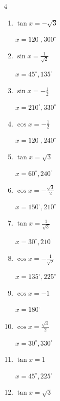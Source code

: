 \begin{multicols}{4}
\begin{enumerate}
  \item $\displaystyle \tan{x}  = -\sqrt{3}$

        $\displaystyle x = 120^{\circ} , 300^{\circ}$

  \item $\displaystyle \sin{x}  = \frac{1}{\sqrt{2}}$

        $\displaystyle x = 45^{\circ} , 135^{\circ}$

  \item $\displaystyle \sin{x}  = -\frac{1}{2}$

        $\displaystyle x = 210^{\circ} , 330^{\circ}$

  \item $\displaystyle \cos{x}  = -\frac{1}{2}$

        $\displaystyle x = 120^{\circ} , 240^{\circ}$

\columnbreak %

  \item $\displaystyle \tan{x}  = \sqrt{3}$

        $\displaystyle x = 60^{\circ} , 240^{\circ}$

  \item $\displaystyle \cos{x}  = -\frac{\sqrt{3}}{2}$

        $\displaystyle x = 150^{\circ} , 210^{\circ}$

  \item $\displaystyle \tan{x}  = \frac{1}{\sqrt{3}}$

        $\displaystyle x = 30^{\circ} , 210^{\circ}$

  \item $\displaystyle \cos{x}  = -\frac{1}{\sqrt{2}}$

        $\displaystyle x = 135^{\circ} , 225^{\circ}$

  \item $\displaystyle \cos{x}  = -1$

        $\displaystyle x = 180^{\circ}$

  \item $\displaystyle \cos{x}  = \frac{\sqrt{3}}{2}$

        $\displaystyle x = 30^{\circ} , 330^{\circ}$

  \item $\displaystyle \tan{x}  = 1$

        $\displaystyle x = 45^{\circ} , 225^{\circ}$

  \item $\displaystyle \tan{x}  = \sqrt{3}$


\end{enumerate}
\end{multicols}
